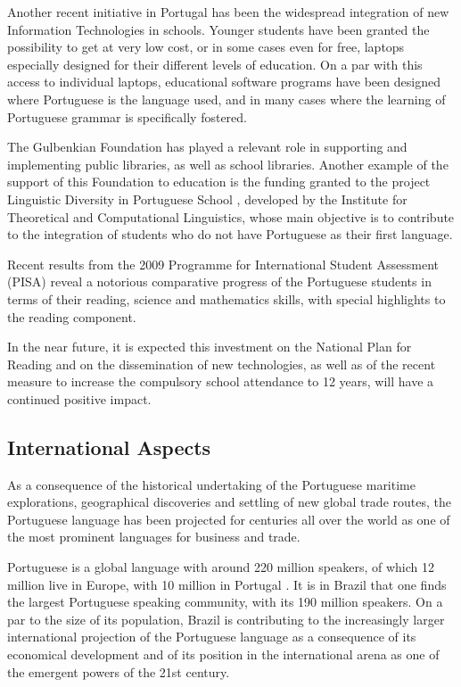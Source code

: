 \begin{multicols}{2}
Another recent initiative in Portugal has been the widespread integration of new Information Technologies in schools. Younger students have been granted the possibility to get at very low cost, or in some cases even for free, laptops especially designed for their different levels of education. On a par with this access to individual laptops, educational software programs have been designed where Portuguese is the language used, and in many cases where the learning of Portuguese grammar is specifically fostered.


The Gulbenkian Foundation has played a relevant role in supporting and implementing public libraries, as well as school libraries. Another example of the support of this Foundation to education is the funding granted to the project Linguistic Diversity in Portuguese School \cite{gulbenkian2}, developed by the Institute for Theoretical and Computational Linguistics, whose main objective is to contribute to the integration of students who do not have Portuguese as their first language.

Recent results from the 2009 Programme for International Student Assessment (PISA) reveal a notorious comparative progress of the Portuguese students in terms of their reading, science and mathematics skills, with special highlights to the reading component. 

In the near future, it is expected this investment on the National Plan for Reading and on the dissemination of new technologies, 
as well as of the recent measure to increase the compulsory school attendance to 12 years, will have a continued positive impact.

\subsection{International Aspects}

 As a consequence of the historical undertaking of the Portuguese maritime explorations, geographical discoveries and settling of new global trade routes, 
the Portuguese language has been projected for centuries all over the world as one of the most prominent languages for business and trade.

Portuguese is a global language with around 220 million speakers, of which 12 million live in Europe, with 10 million in Portugal \cite{census}. 
It is in Brazil that one finds the largest Portuguese speaking community, with its 190 million speakers. 
On a par to the size of its population, Brazil is contributing to the increasingly larger international projection of the Portuguese language as a consequence of its economical development and of its position in the international arena as one of the emergent powers of the 21st century. 


\end{multicols}
